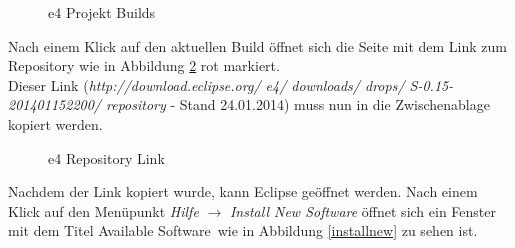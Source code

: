 \begin{figure}[H]
  \vspace{0.5cm}
  \centering
  \caption{e4 Projekt Builds}
  \label{e4download}
  \vspace{0.5cm}
\end{figure}

Nach einem Klick auf den aktuellen Build öffnet sich die Seite mit dem Link zum Repository wie in Abbildung \ref{repolink} rot markiert.\\
Dieser Link (\textit{http://download.eclipse.org/ e4/ downloads/ drops/ S-0.15-201401152200/ repository} - Stand 24.01.2014) muss nun in die Zwischenablage kopiert werden.

\begin{figure}[H]
  \vspace{0.5cm}
  \centering
  \caption{e4 Repository Link}
  \label{repolink}
  \vspace{0.5cm}
\end{figure}

Nachdem der Link kopiert wurde, kann Eclipse geöffnet werden. Nach einem Klick auf den Menüpunkt \textit{Hilfe} $\rightarrow$ \textit{Install New Software} öffnet sich ein Fenster mit dem Titel \glqq Available Software\grqq\ wie in Abbildung \ref{installnew} zu sehen ist. 

